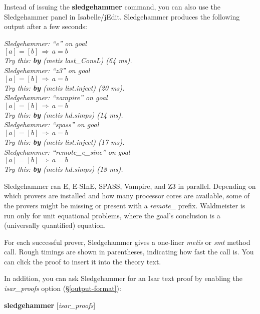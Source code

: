 \documentclass[a4paper,12pt]{article}
\begin{document}
Instead of issuing the \textbf{sledgehammer} command, you can also use the
Sledgehammer panel in Isabelle/jEdit. Sledgehammer produces the following output
after a few seconds:

\prew
\slshape
Sledgehammer: ``\textit{e\/}'' on goal \\
$[a] = [b] \,\Longrightarrow\, a = b$ \\
Try this: \textbf{by} (\textit{metis last\_ConsL}) (64 ms). \\[3\smallskipamount]
%
Sledgehammer: ``\textit{z3\/}'' on goal \\
$[a] = [b] \,\Longrightarrow\, a = b$ \\
Try this: \textbf{by} (\textit{metis list.inject}) (20 ms). \\[3\smallskipamount]
%
Sledgehammer: ``\textit{vampire\/}'' on goal \\
$[a] = [b] \,\Longrightarrow\, a = b$ \\
Try this: \textbf{by} (\textit{metis hd.simps}) (14 ms). \\[3\smallskipamount]
%
Sledgehammer: ``\textit{spass\/}'' on goal \\
$[a] = [b] \,\Longrightarrow\, a = b$ \\
Try this: \textbf{by} (\textit{metis list.inject}) (17 ms). \\[3\smallskipamount]
%
Sledgehammer: ``\textit{remote\_e\_sine\/}'' on goal \\
$[a] = [b] \,\Longrightarrow\, a = b$ \\
Try this: \textbf{by} (\textit{metis hd.simps}) (18 ms).
\postw

Sledgehammer ran E, E-SInE, SPASS, Vampire, and Z3 in parallel. Depending on
which provers are installed and how many processor cores are available, some of
the provers might be missing or present with a \textit{remote\_} prefix.
Waldmeister is run only for unit equational problems, where the goal's
conclusion is a (universally quantified) equation.

For each successful prover, Sledgehammer gives a one-liner \textit{metis} or
\textit{smt} method call. Rough timings are shown in parentheses, indicating how
fast the call is. You can click the proof to insert it into the theory text.

In addition, you can ask Sledgehammer for an Isar text proof by enabling the
\textit{isar\_proofs} option (\S\ref{output-format}):

\prew
\textbf{sledgehammer} [\textit{isar\_proofs}]
\postw
\end{document}
